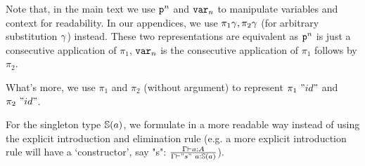 Note that, in the main text we use $\texttt{p}^{n}$ and $\texttt{var}_{n}$ to manipulate variables and context for readability. In our appendices, we use $\pi_1 \gamma, \pi_2 \gamma$ (for arbitrary substitution $\gamma$) instead. These two representations are equivalent as $\texttt{p}^{n}$ is just a consecutive application of $\pi_1$, $\texttt{var}_{n}$ is the consecutive application of $\pi_1$ follows by $\pi_2$.

What's more, we use $\pi_1$ and $\pi_2$ (without argument) to represent $\pi_1~"id"$ and $\pi_2~"id"$.

For the singleton type $\mathbb{S}({a})$, we formulate in a more readable way instead of using the explicit introduction and elimination rule (e.g. a more explicit introduction rule will have a `constructor', say "s": $\frac{ {\Gamma} \vdash {a} : {A} }{ {\Gamma} \vdash {"s"~a} : {\mathbb{S}({a})} }$).



